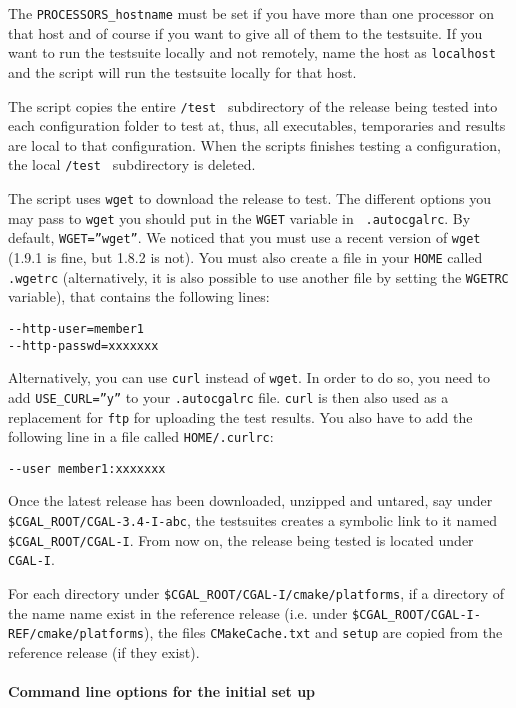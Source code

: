 The {\tt PROCESSORS\_hostname} must be set if you have more
than one processor on that host and of course if you want to give all
of them to the testsuite. If you want to run the testsuite locally and
not remotely, name the host as {\tt localhost} and the script will run
the testsuite locally for that host.

The script copies the entire {\tt /test } subdirectory of the release being tested
into each configuration folder to test at, thus, all executables, temporaries
and results are local to that configuration. When the scripts finishes testing 
a configuration, the local {\tt /test } subdirectory is deleted.

The script uses {\tt wget} to download the release to test. The different options you
may pass to {\tt wget} you should put in the {\tt WGET} variable in {\tt
.autocgalrc}. By default, {\tt WGET=''wget''}. We noticed that you must use
a recent version of {\tt wget} (1.9.1 is fine, but 1.8.2 is not). You must
also create a file in your {\tt HOME} called {\tt .wgetrc} (alternatively,
it is also possible to use another file by setting the {\tt WGETRC} variable),
that contains the following lines:
\begin{verbatim}
--http-user=member1
--http-passwd=xxxxxxx
\end{verbatim}

Alternatively, you can use {\tt curl} instead of {\tt wget}.  In order to
do so, you need to add {\tt USE\_CURL=''y''} to your {\tt .autocgalrc} file.
{\tt curl} is then also used as a replacement for {\tt ftp} for uploading the
test results.
You also have to add the following line in a file called {\tt HOME/.curlrc}:
\begin{verbatim}
--user member1:xxxxxxx
\end{verbatim}

Once the latest release has been downloaded, unzipped and untared, 
say under {\tt \$CGAL\_ROOT/CGAL-3.4-I-abc}, the testsuites creates
a symbolic link to it named {\tt \$CGAL\_ROOT/CGAL-I}. From now on,
the release being tested is located under {\tt CGAL-I}.

For each directory under {\tt \$CGAL\_ROOT/CGAL-I/cmake/platforms}, 
if a directory of the name name exist in the reference release 
(i.e. under {\tt \$CGAL\_ROOT/CGAL-I-REF/cmake/platforms}),
the files {\tt CMakeCache.txt} and {\tt setup} are copied
from the reference release (if they exist). 

\paragraph{Command line options for the initial set up} ~

